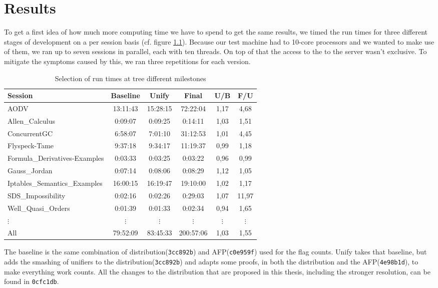 \chapter{Results}\label{chapter:results}

To get a first idea of how much more computing time we have to spend to get the same results, we timed the run times for three different stages of development on a per session basis (cf. figure \ref{tab:runtimes}). Because our test machine had to 10-core processors and we wanted to make use of them, we ran up to seven sessions in parallel, each with ten threads. On top of that the access to the to the server wasn't exclusive. To mitigate the symptoms caused by this, we ran three repetitions for each version.

\begin{table}[ht]
\caption{Selection of run times at tree different milestones}
\begin{tabular}{l *{5}{c}}
Session & Baseline & Unify & Final & U/B & F/U\\ \hline
AODV & 13:11:43 & 15:28:15 & 72:22:04 & 1,17 & 4,68\\
Allen\_Calculus & 0:09:07 & 0:09:25 & 0:14:11 & 1,03 & 1,51\\
ConcurrentGC & 6:58:07 & 7:01:10 & 31:12:53 & 1,01 & 4,45\\
Flyspeck-Tame & 9:37:18 & 9:34:17 & 11:19:37 & 0,99 & 1,18\\
Formula\_Derivatives-Examples & 0:03:33 & 0:03:25 & 0:03:22 & 0,96 & 0,99\\
Gauss\_Jordan & 0:07:14 & 0:08:06 & 0:08:29 & 1,12 & 1,05\\
Iptables\_Semantics\_Examples & 16:00:15 & 16:19:47 & 19:10:00 & 1,02 & 1,17\\
SDS\_Impossibility & 0:02:16 & 0:02:26 & 0:29:03 & 1,07 & 11,97\\
Well\_Quasi\_Orders & 0:01:39 & 0:01:33 & 0:02:34 & 0,94 & 1,65\\
$\vdots$ & $\vdots$ & $\vdots$ & $\vdots$ & $\vdots$ & $\vdots$\\
\hline\hline
All & 79:52:09 & 83:45:33 & 200:57:06 & 1,03 & 1,55\\
\end{tabular}
\label{tab:runtimes}
\centering
\end{table}

The baseline is the same combination of distribution(\texttt{3cc892b}) and AFP(\texttt{c0e959f}) used for the flag counts. Unify takes that baseline, but adds the smashing of unifiers to the distribution(\texttt{3cc892b}) and adapts some proofs, in both the distribution and the AFP(\texttt{4e98b1d}), to make everything work counts. All the changes to the distribution that are proposed in this thesis, including the stronger resolution, can be found in \texttt{0cfc1db}.\\

